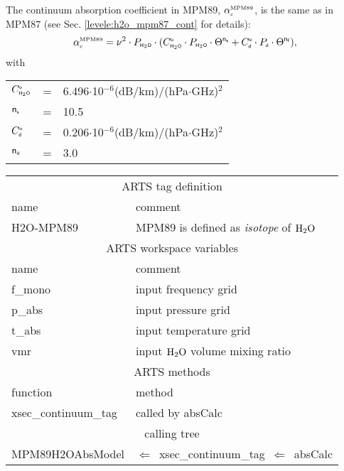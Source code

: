 \label{levele:h2o_mpm89_cont}
The continuum absorption coefficient in MPM89, $\alpha^{\mbox{\rm \tiny MPM89}}_{\mbox{\tiny c}}$, 
is the same as in MPM87 (see Sec. \ref{levele:h2o_mpm87_cont} for 
details):\\
\begin{equation} 
  \label{eq:mpm89:cont}
  \alpha^{\mbox{\rm \tiny MPM89}}_{\mbox{\tiny c}} = \nu^2 \cdot P_{\mbox{\tiny \sf H}_{2}\mbox{\tiny \sf O}} \cdot 
                (C^{\mbox{\tiny \sf o}}_{\mbox{\tiny \sf H}_{2}\mbox{\tiny \sf O}} \cdot P_{\mbox{\tiny \sf H}_{2}\mbox{\tiny \sf O}} \cdot \Theta^{{\sf n}_{\mbox{\tiny \sf s}}} + 
                 C^{\mbox{\tiny \sf o}}_{\mbox{\tiny \sf d}} \cdot P_{\mbox{\tiny \sf d}}  \cdot \Theta^{{\sf n}_{\mbox{\tiny \sf f}}}),
\end{equation}
with\\
\begin{tabular}{lcl}
$C^{\mbox{\tiny \sf o}}_{\mbox{\tiny \sf H}_{2}\mbox{\tiny \sf O}}$   & = & 6.496$\cdot$10$^{-6}$(dB/km)/(hPa$\cdot$GHz)$^2$\\
${\sf n}_{\mbox{\tiny \sf s}}$    & = & 10.5\\
$C^{\mbox{\tiny \sf o}}_{\mbox{\tiny \sf d}}$   & = & 0.206$\cdot$10$^{-6}$(dB/km)/(hPa$\cdot$GHz)$^2$\\
${\sf n}_{\mbox{\tiny \sf d}}$    & = & 3.0\\
\end{tabular}
%
%
\begin{center}
\begin{tabular}{ll}
\hline
\multicolumn{2}{c}{ARTS tag definition}\\
name      & comment \\
H2O-MPM89 & MPM89 is defined as {\it isotope} of $\mbox{H}_2\mbox{O}$\\
\hline
\multicolumn{2}{c}{ARTS workspace variables}\\
name & comment \\
 f\_mono & input frequency grid \\
 p\_abs  & input pressure grid \\
 t\_abs  & input temperature grid\\
 vmr    & input $\mbox{H}_2\mbox{O}$ volume mixing ratio\\
\hline
\multicolumn{2}{c}{ARTS methods}\\
function           & method\\
xsec\_continuum\_tag & called by absCalc \\
\hline
\multicolumn{2}{c}{calling tree}\\
MPM89H2OAbsModel & $\Leftarrow$~xsec\_continuum\_tag~$\Leftarrow$~absCalc\\
\end{tabular}
\end{center}

